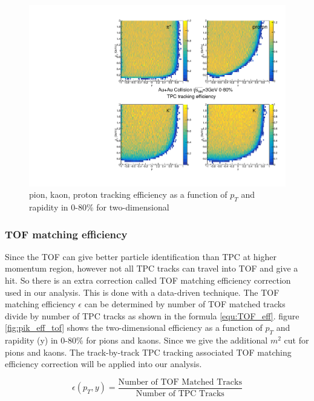 \begin{figure}
    \centering
    \includegraphics[scale=0.5]{FXT3gev/chapter2/fig/eff/pik_tpceff.pdf}
    \caption{pion, kaon, proton tracking efficiency as a function of $p_{T}$ and rapidity in 0-80\% for two-dimensional}
    \label{fig:pikp_eff_tpc}
\end{figure}
	
\subsubsection{TOF matching efficiency}

Since the TOF can give better particle identification than TPC at higher momentum region, however not all TPC tracks can travel into TOF and give a hit. So there is an extra correction called TOF matching efficiency correction used in our analysis. This is done with a data-driven technique. The TOF matching efficiency $\epsilon$ can be determined by number of TOF matched tracks divide by number of TPC tracks as shown in the formula \ref{equ:TOF_eff}. 
figure \ref{fig:pik_eff_tof} shows the two-dimensional efficiency as a function of $p_{T}$ and rapidity (y) in 0-80\% for pions and kaons. Since we give the additional $m^{2}$ cut for pions and kaons.
The track-by-track TPC tracking associated TOF matching efficiency correction will be applied into our analysis.

\begin{equation}
    \epsilon (p_{T}, y) = \frac{\text{Number of TOF Matched Tracks}}{\text{Number of TPC Tracks}}
    \label{equ:TOF_eff}
\end{equation}

